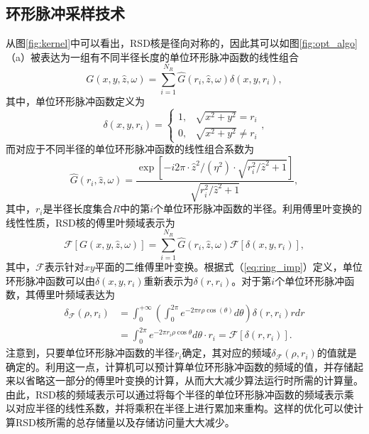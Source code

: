 \documentclass[master]{shtthesis}             %
\begin{document}
\subsection{环形脉冲采样技术}

从图\ref{fig:kernel}中可以看出，RSD核是径向对称的，因此其可以如图\ref{fig:opt_algo}（a）被表达为一组有不同半径长度的单位环形脉冲函数的线性组合
\begin{equation}
    G(x, y, \hat{z}, \omega) = \sum_{i=1}^{N_R}\hat{G}(r_i, \hat{z}, \omega)\delta(x, y, r_i),
\end{equation}
其中，单位环形脉冲函数定义为
\begin{equation}
    \delta(x, y, r_i) = \begin{cases}
      1, & \sqrt{x^2+y^2} = r_i\\
      0, & \sqrt{x^2+y^2} \neq r_i
    \end{cases}\label{eq:ring_imp},
\end{equation}
而对应于不同半径的单位环形脉冲函数的线性组合系数为
\begin{equation} \label{eq:ori_coef}
    \hat{G}(r_i, \hat{z}, \omega) = \frac{\exp{\left[-i2\pi\cdot\hat{z}^2/(\eta^2)\cdot\sqrt{r_i^2/\hat{z}^2+1}\right]}}{\sqrt{r_i^2/\hat{z}^2+1}},
\end{equation}
其中，$r_i$是半径长度集合$R$中的第$i$个单位环形脉冲函数的半径。利用傅里叶变换的线性性质，RSD核的傅里叶频域表示为
\begin{equation}
    \mathcal{F}\left[G(x, y, \hat{z}, \omega)\right] = \sum_{i=1}^{N_{ {R}}}\hat{G}(r_i, \hat{z}, \omega)\mathcal{F}\left[\delta(x, y, r_i)\right],
\end{equation}
其中，$\mathcal{F}$表示针对$xy$平面的二维傅里叶变换。根据式（\ref{eq:ring_imp}）定义，单位环形脉冲函数可以由$\delta(x,y,r_i)$重新表示为$\delta(r,r_i)$。对于第$i$个单位环形脉冲函数，其傅里叶频域表达为
\begin{equation}
    \begin{split}
        \delta_{\mathcal{F}}(\rho, r_i)&=\int_0^{+\infty}\left(\int_0^{2\pi}e^{-2\pi r\rho \cos (\theta)}d\theta\right)\delta(r, r_i)rdr\\
        &=\int^{2\pi}_0e^{-2\pi r_i\rho \cos \theta}d\theta \cdot r_i = \mathcal{F}\left[ \delta(r,r_i) \right].
    \end{split}
\end{equation}
注意到，只要单位环形脉冲函数的半径$r_i$确定，其对应的频域$\delta_{\mathcal{F}}(\rho,r_i)$的值就是确定的。利用这一点，计算机可以预计算单位环形脉冲函数的频域的值，并存储起来以省略这一部分的傅里叶变换的计算，从而大大减少算法运行时所需的计算量。由此，RSD核的频域表示可以通过将每个半径的单位环形脉冲函数的频域表示乘以对应半径的线性系数，并将乘积在半径上进行累加来重构。这样的优化可以使计算RSD核所需的总存储量以及存储访问量大大减少。
\end{document}
